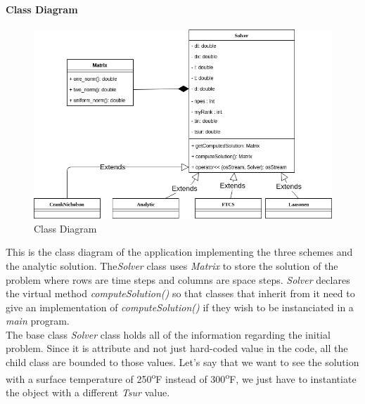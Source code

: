 \documentclass[12pt, a4paper]{report}
\begin{document}
\paragraph{Class Diagram}
\begin{figure}[h]
\centering
\includegraphics[scale=0.5]{report/ClassDiagram.png}
\caption{Class Diagram}
\end{figure}

This is the class diagram of the application implementing the three schemes and the analytic solution.  The\textit{Solver} class uses \textit{Matrix} to store the solution of the problem where rows are time steps and columns are space steps. \textit{Solver} declares the virtual method \textit{computeSolution()} so that classes that inherit from it need to give an implementation of \textit{computeSolution()} if they wish to be instanciated in a \textit{main} program.\\
The base class \textit{Solver} class holds all of the information regarding the initial problem. Since it is attribute and not just hard-coded value in the code, all the child class are bounded to those values. Let's say that we want to see the solution with a surface temperature of 250\textsuperscript{o}F instead of 300\textsuperscript{o}F, we just have to instantiate the object with a different \textit{Tsur} value.
\end{document}
